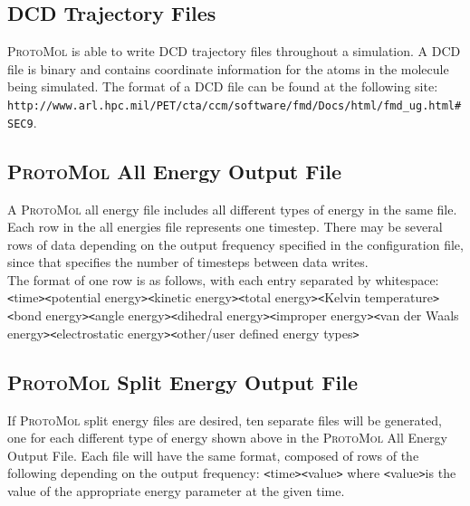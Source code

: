 \documentclass[11pt]{report}
\newcommand{\ProtoMol}{\textsc{ProtoMol }}
\newcommand{\tempstart}{\texttt{<}}
\newcommand{\tempend}{\texttt{>}}
\begin{document}
\subsection{DCD Trajectory Files}
\ProtoMol is able to write DCD trajectory files throughout a
simulation.  A DCD file is binary and contains coordinate information
for the atoms in the molecule being simulated.  The format of a DCD
file can be found at the following site: \newline 
\newline
\texttt {http://www.arl.hpc.mil/PET/cta/ccm/software/fmd/Docs/html/fmd\_ug.html\#SEC9}.


\subsection{\ProtoMol All Energy Output File }

A \ProtoMol all energy file includes all different types of energy in
the same file.  Each row in the all energies file represents one
timestep.  There may be several rows of data depending on the output
frequency specified in the configuration file, since that specifies
the number of timesteps between data writes.\\

The format of one row is as follows, with each entry separated by whitespace:
\newline
\newline
\tempstart time\tempend   \tempstart potential energy\tempend   \tempstart kinetic energy\tempend   \tempstart total
energy\tempend   \tempstart Kelvin temperature\tempend   \tempstart bond energy\tempend   \tempstart angle
energy\tempend   \tempstart dihedral energy\tempend   \tempstart improper energy\tempend   \tempstart van der
Waals energy\tempend   \tempstart electrostatic energy\tempend  \tempstart other/user defined energy types\tempend 


\subsection{\ProtoMol Split Energy Output File}

If \ProtoMol split energy files are desired, ten separate files will be generated, one for each different type of energy shown above in the \ProtoMol All Energy Output File.  Each file will have the same format, composed of rows of the following depending on the output frequency:
\newline
\newline
\tempstart time\tempend     \tempstart value\tempend 
\newline
\newline
where \tempstart value\tempend  is the value of the appropriate energy parameter at the given time.
\end{document}
